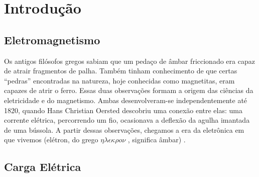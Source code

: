 \section{Introdução}

\subsection{Eletromagnetismo}

Os antigos filósofos gregos sabiam que um pedaço de âmbar
friccionado era capaz de atrair fragmentos de palha. Também
tinham conhecimento de que certas ``pedras'' encontradas na
natureza, hoje conhecidas como magnetitas, eram capazes de atrir
o ferro. Essas duas observações formam a origem das ciências
da eletricidade e do magnetismo. Ambas desenvolveram-se
independentemente até 1820, quando Hans Christian Oersted 
descobriu uma conexão entre elas: uma corrente elétrica, 
percorrendo um fio, ocasionava a deflexão da agulha imantada de
uma bússola. A partir dessas observações, chegamos a era da 
eletrônica em que vivemos (elétron, do grego 
$\eta\lambda\epsilon\kappa\rho o\nu$ , 
significa âmbar) \cite{halliday}.

\subsection{Carga Elétrica}


